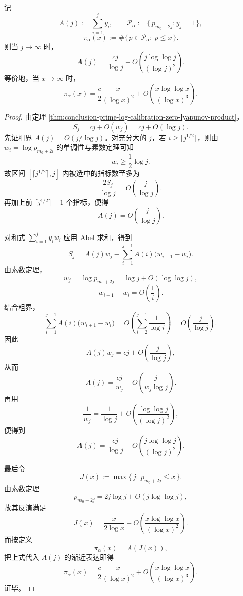 \begin{theorem}\label{thm:conclusion-prime-log-calibration-prime-sparsity}
记
\[
A(j):=\sum_{i=1}^{j}y_i,
\qquad
\mathcal P_\alpha:=\{\,p_{m_0+2j}: y_j=1\,\},
\]
\[
\pi_\alpha(x):=\#\{\,p\in\mathcal P_\alpha:\ p\le x\,\}.
\]
则当 \(j\to\infty\) 时，
\[
A(j)
=
\frac{cj}{\log j}
+O\!\left(\frac{j\log\log j}{(\log j)^2}\right).
\]
等价地，当 \(x\to\infty\) 时，
\[
\pi_\alpha(x)
=
\frac{c}{2}\frac{x}{(\log x)^2}
+O\!\left(\frac{x\log\log x}{(\log x)^3}\right).
\]
\end{theorem}
\begin{proof}
由定理 \ref{thm:conclusion-prime-log-calibration-zero-lyapunov-product}，
\[
S_j=cj+O(w_j)=cj+O(\log j).
\]
先证粗界 \(A(j)=O(j/\log j)\)。对充分大的 \(j\)，若 \(i\ge \lceil j^{1/2}\rceil\)，则由 \(w_i=\log p_{m_0+2i}\) 的单调性与素数定理可知
\[
w_i\ge \frac12\log j.
\]
故区间 \([\lceil j^{1/2}\rceil,j]\) 内被选中的指标数至多为
\[
\frac{2S_j}{\log j}
=
O\!\left(\frac{j}{\log j}\right).
\]
再加上前 \(\lceil j^{1/2}\rceil-1\) 个指标，便得
\[
A(j)=O\!\left(\frac{j}{\log j}\right).
\]

对和式 \(\sum_{i=1}^{j}y_iw_i\) 应用 Abel 求和，得到
\[
S_j=A(j)w_j-\sum_{i=1}^{j-1}A(i)\bigl(w_{i+1}-w_i\bigr).
\]
由素数定理，
\[
w_j=\log p_{m_0+2j}
=
\log j+O(\log\log j),
\]
\[
w_{i+1}-w_i=O\!\left(\frac{1}{i}\right).
\]
结合粗界，
\[
\sum_{i=1}^{j-1}A(i)\bigl(w_{i+1}-w_i\bigr)
=
O\!\left(\sum_{i=2}^{j-1}\frac{1}{\log i}\right)
=
O\!\left(\frac{j}{\log j}\right).
\]
因此
\[
A(j)w_j
=
cj+O\!\left(\frac{j}{\log j}\right),
\]
从而
\[
A(j)
=
\frac{cj}{w_j}
+O\!\left(\frac{j}{w_j\log j}\right).
\]
再用
\[
\frac{1}{w_j}
=
\frac{1}{\log j}
+O\!\left(\frac{\log\log j}{(\log j)^2}\right),
\]
便得到
\[
A(j)
=
\frac{cj}{\log j}
+O\!\left(\frac{j\log\log j}{(\log j)^2}\right).
\]

最后令
\[
J(x):=\max\{\,j:\ p_{m_0+2j}\le x\,\}.
\]
由素数定理
\[
p_{m_0+2j}=2j\log j+O(j\log\log j),
\]
故其反演满足
\[
J(x)
=
\frac{x}{2\log x}
+O\!\left(\frac{x\log\log x}{(\log x)^2}\right).
\]
而按定义
\[
\pi_\alpha(x)=A(J(x)),
\]
把上式代入 \(A(j)\) 的渐近表达即得
\[
\pi_\alpha(x)
=
\frac{c}{2}\frac{x}{(\log x)^2}
+O\!\left(\frac{x\log\log x}{(\log x)^3}\right).
\]
证毕。
\end{proof}

